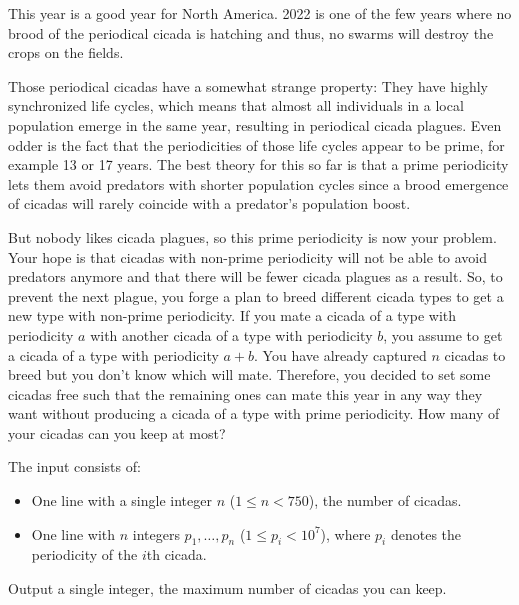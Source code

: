 
This year is a good year for North America.
2022 is one of the few years where no brood of the periodical cicada is hatching and thus, no swarms will destroy the crops on the fields.

Those periodical cicadas have a somewhat strange property: They have highly synchronized life cycles, which means that almost all individuals in a local population emerge in the same year, resulting in periodical cicada plagues. 
Even odder is the fact that the periodicities of those life cycles appear to be prime, for example 13 or 17 years. 
The best theory for this so far is that a prime periodicity lets them avoid predators with shorter population cycles since a brood emergence of cicadas will rarely coincide with a predator's population boost. 

But nobody likes cicada plagues, so this prime periodicity is now your problem.
Your hope is that cicadas with non-prime periodicity will not be able to avoid predators anymore and that there will be fewer cicada plagues as a result. 
So, to prevent the next plague, you forge a plan to breed different cicada types to get a new type with non-prime periodicity.
If you mate a cicada of a type with periodicity $a$ with another cicada of a type with periodicity $b$, you assume to get a cicada of a type with periodicity $a+b$.
You have already captured $n$ cicadas to breed but you don't know which will mate.
Therefore, you decided to set some cicadas free such that the remaining ones can mate this year in any way they want without producing a cicada of a type with prime periodicity.
How many of your cicadas can you keep at most?

\begin{Input}
	The input consists of:
	\begin{itemize}
		\item One line with a single integer $n$ ($1\leq n<750$), the number of cicadas.
		\item One line with $n$ integers $p_1, \ldots, p_n$ ($1\leq p_i<10^7$), where $p_i$ denotes the periodicity of the $i$th cicada.
	\end{itemize}
\end{Input}

\begin{Output}
	Output a single integer, the maximum number of cicadas you can keep.
\end{Output}
